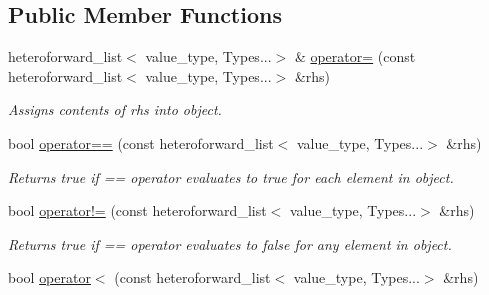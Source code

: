 \subsection*{Public Member Functions}
\begin{DoxyCompactItemize}
\item 
\hypertarget{classheterogeneous_1_1heteroforward__list_3_01_t_00_01_types_8_8_8_4_a22fa6977c9da1bd9e7c61919a4cae0fe}{}heteroforward\+\_\+list$<$ value\+\_\+type, Types...$>$ \& \hyperlink{classheterogeneous_1_1heteroforward__list_3_01_t_00_01_types_8_8_8_4_a22fa6977c9da1bd9e7c61919a4cae0fe}{operator=} (const heteroforward\+\_\+list$<$ value\+\_\+type, Types...$>$ \&rhs)\label{classheterogeneous_1_1heteroforward__list_3_01_t_00_01_types_8_8_8_4_a22fa6977c9da1bd9e7c61919a4cae0fe}

\begin{DoxyCompactList}\small\item\em Assigns contents of rhs into object. \end{DoxyCompactList}\item 
\hypertarget{classheterogeneous_1_1heteroforward__list_3_01_t_00_01_types_8_8_8_4_a61e58a733cf488e62dd54dafcdce6cb4}{}bool \hyperlink{classheterogeneous_1_1heteroforward__list_3_01_t_00_01_types_8_8_8_4_a61e58a733cf488e62dd54dafcdce6cb4}{operator==} (const heteroforward\+\_\+list$<$ value\+\_\+type, Types...$>$ \&rhs)\label{classheterogeneous_1_1heteroforward__list_3_01_t_00_01_types_8_8_8_4_a61e58a733cf488e62dd54dafcdce6cb4}

\begin{DoxyCompactList}\small\item\em Returns true if == operator evaluates to true for each element in object. \end{DoxyCompactList}\item 
\hypertarget{classheterogeneous_1_1heteroforward__list_3_01_t_00_01_types_8_8_8_4_ab119db8ca68b59a2c55941cfedff9e3c}{}bool \hyperlink{classheterogeneous_1_1heteroforward__list_3_01_t_00_01_types_8_8_8_4_ab119db8ca68b59a2c55941cfedff9e3c}{operator!=} (const heteroforward\+\_\+list$<$ value\+\_\+type, Types...$>$ \&rhs)\label{classheterogeneous_1_1heteroforward__list_3_01_t_00_01_types_8_8_8_4_ab119db8ca68b59a2c55941cfedff9e3c}

\begin{DoxyCompactList}\small\item\em Returns true if == operator evaluates to false for any element in object. \end{DoxyCompactList}\item 
\hypertarget{classheterogeneous_1_1heteroforward__list_3_01_t_00_01_types_8_8_8_4_ab4fa94912e14f683c35c3ca7ab491b52}{}bool \hyperlink{classheterogeneous_1_1heteroforward__list_3_01_t_00_01_types_8_8_8_4_ab4fa94912e14f683c35c3ca7ab491b52}{operator$<$} (const heteroforward\+\_\+list$<$ value\+\_\+type, Types...$>$ \&rhs)\label{classheterogeneous_1_1heteroforward__list_3_01_t_00_01_types_8_8_8_4_ab4fa94912e14f683c35c3ca7ab491b52}


\end{DoxyCompactItemize}
